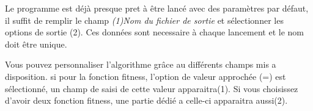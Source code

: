 \documentclass[a4paper,11pt]{article}
\begin{document}
\begin{figure}
\begin{center}
  \end{center}
      \vspace{-1cm}
  \begin{center}
  \end{center}
      \vspace{-1cm}
  \begin{center}
  \end{center}
\end{figure}
Le programme est déjà presque pret à être lancé avec des paramètres par défaut, il suffit de remplir le champ \textit{(1)Nom du fichier de sortie} et sélectionner les options de sortie (2). Ces données sont necessaire à chaque lancement et le nom doit être unique. \\
\vspace{0.6cm}

Vous pouvez personnaliser l'algorithme grâce au différents champs mis a disposition. si pour la fonction fitness, l'option de valeur approchée (=) est sélectionné, un champ de saisi de cette valeur apparaitra(1).
Si vous choisissez d'avoir deux fonction fitness, une partie dédié a celle-ci apparaitra aussi(2).\\
\end{document}
